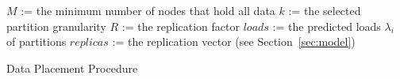 \begin{algorithm}[!htbp]
 \SetAlgoLined
 \DontPrintSemicolon
 \DontPrintSemicolon
 $M$ := the minimum number of nodes that hold all data\;
 $k$ := the selected partition granularity\;
 $R$ := the replication factor\;
 $loads$ := the predicted loads $\lambda_i$ of partitions\;
 $replicas$ := the replication vector (see Section~\ref{sec:model})

 \caption{Data Placement Procedure}
 \label{alg:dp}
\end{algorithm}

